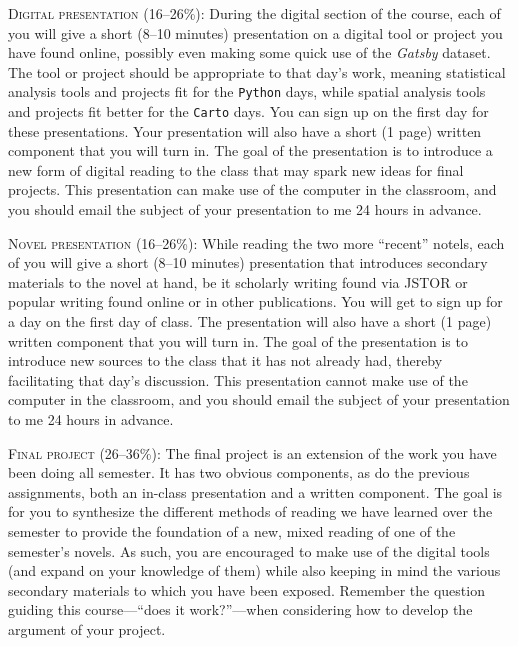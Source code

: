 \begin{description}
  \item \textsc{Digital presentation (16–26\%):} During the digital section of
    the course, each of you will give a short (8–10 minutes) presentation on a
    digital tool or project you have found online, possibly even making some
    quick use of the \textit{Gatsby} dataset. The tool or project should be
    appropriate to that day’s work, meaning statistical analysis tools and
    projects fit for the \texttt{Python} days, while spatial analysis tools and
    projects fit better for the \texttt{Carto} days. You can sign up on the
    first day for these presentations. Your presentation will also have a short
    (1 page) written component that you will turn in. The goal of the
    presentation is to introduce a new form of digital reading to the class
    that may spark new ideas for final projects. This presentation can make use
    of the computer in the classroom, and you should email the subject of your
    presentation to me 24 hours in advance.

  \item \textsc{Novel presentation (16–26\%):} While reading the two more
    “recent” notels, each of you will give a short (8–10 minutes) presentation
    that introduces secondary materials to the novel at hand, be it scholarly
    writing found via JSTOR or popular writing found online or in other
    publications. You will get to sign up for a day on the first day of class.
    The presentation will also have a short (1 page) written component that you
    will turn in. The goal of the presentation is to introduce new sources to
    the class that it has not already had, thereby facilitating that day’s
    discussion. This presentation cannot make use of the computer in the
    classroom, and you should email the subject of your presentation to me 24
    hours in advance.

  \item \textsc{Final project (26–36\%):} The final project is an extension of
    the work you have been doing all semester. It has two obvious components,
    as do the previous assignments, both an in-class presentation and a written
    component. The goal is for you to synthesize the different methods of
    reading we have learned over the semester to provide the foundation of a
    new, mixed reading of one of the semester’s novels. As such, you are
    encouraged to make use of the digital tools (and expand on your knowledge
    of them) while also keeping in mind the various secondary materials to
    which you have been exposed.  Remember the question guiding this
    course—“does it work?”—when considering how to develop the argument of your
    project. 


\end{description}
